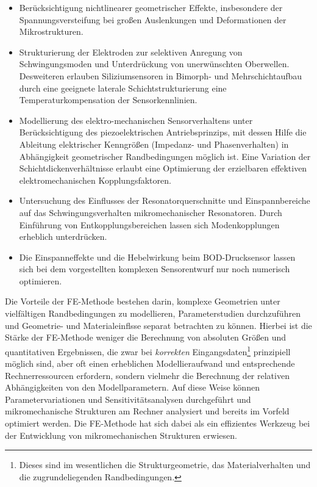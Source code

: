 \begin{itemize}
\item
Berücksichtigung nichtlinearer geometrischer Effekte, insbesondere der
Spannungsversteifung bei großen Auslenkungen und Deformationen der
Mikrostrukturen.
\item
Strukturierung der Elektroden zur selektiven Anregung von Schwingungsmoden
und Unterdrückung von unerwünschten Oberwellen. Desweiteren erlauben
Siliziumsensoren in Bimorph- und Mehrschichtaufbau durch eine geeignete
laterale Schichtstrukturierung eine Temperaturkompensation der
Sensorkennlinien.
\item
Modellierung des elektro-mechanischen Sensorverhaltens unter
Berücksichtigung des piezoelektrischen Antriebsprinzips, mit dessen
Hilfe die Ableitung elektrischer Kenngrößen (Impedanz- und Phasenverhalten)
in Abhängigkeit geometrischer Randbedingungen möglich ist. Eine Variation
der Schichtdickenverhältnisse erlaubt eine Optimierung der erzielbaren
effektiven elektromechanischen Kopplungsfaktoren.
\item
Untersuchung des Einflusses der Resonatorquerschnitte und Einspannbereiche
auf das Schwingungsverhalten mikromechanischer Resonatoren. Durch Einführung
von Entkopplungsbereichen lassen sich Modenkopplungen erheblich unterdrücken.
\item
Die Einspanneffekte und die Hebelwirkung beim BOD-Drucksensor lassen sich
bei dem vorgestellten komplexen Sensorentwurf nur noch numerisch
optimieren.
\end{itemize}
%
Die Vorteile der FE-Methode bestehen darin, komplexe Geometrien unter
vielfältigen Randbedingungen zu modellieren,
Parameterstudien durchzuführen und Geometrie- und Materialeinflsse
separat betrachten zu können. Hierbei ist die Stärke der FE-Methode
weniger die Berechnung von absoluten Größen und quantitativen Ergebnissen,
die zwar bei {\em korrekten} Eingangsdaten\footnote{Dieses sind im
wesentlichen die Strukturgeometrie, das Materialverhalten und die
zugrundeliegenden Randbedingungen.} prinzipiell möglich sind, aber oft
einen erheblichen Modellieraufwand und entsprechende Rechnerressourcen
erfordern, sondern vielmehr die Berechnung der relativen Abhängigkeiten
von den Modellparametern. Auf diese Weise können Parametervariationen und
Sensitivitätsanalysen durchgeführt und mikromechanische Strukturen am
Rechner analysiert und bereits im Vorfeld optimiert werden. Die FE-Methode
hat sich dabei als ein effizientes Werkzeug bei der Entwicklung von
mikromechanischen Strukturen erwiesen.\\

